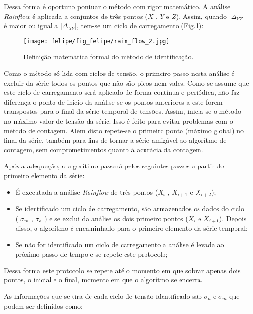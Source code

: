 Dessa forma é oportuno pontuar o método com rigor matemático. A análise \emph{Rainflow} é aplicada a conjuntos de três pontos ($X$ , $Y$ e $Z$). Assim, quando $\left|\Delta_{YZ} \right|$ é maior ou igual a $\left|\Delta_{XY} \right|$, tem-se um ciclo de carregamento (Fig.\ref{rain_flow_2}): 

\begin{figure}[!ht]
    \centering
    \texttt{[image: felipe/fig\_felipe/rain\_flow\_2.jpg]}
    \caption{Definição matemática formal do método de identificação.}
    \label{rain_flow_2}
\end{figure}

Como o método só lida com ciclos de tensão, o primeiro passo nesta análise é excluir da série todos os pontos que não são picos nem vales. Como se assume que este ciclo de carregamento será aplicado de forma contínua e periódica, não faz diferença o ponto de início da análise se os pontos anteriores a este forem transpostos para o final da série temporal de tensões. Assim, inicia-se o método no máximo valor de tensão da série. Isso é feito para evitar problemas com o método de contagem. Além disto repete-se o primeiro ponto (máximo global) no final da série, também para fins de tornar a série amigável ao algorítmo de contagem, sem comprometimentos quanto à acurácia da contagem.

Após a adequação, o algorítimo passará pelos seguintes passos a partir do primeiro elemento da série:
\begin{itemize}
    \item É executada a análise \emph{Rainflow} de três pontos ($X_i$ , $X_{i+1}$ e $X_{i+2}$);
    \item Se identificado um ciclo de carregamento, são armazenados os dados do ciclo ( $\sigma_{m}$ , $\sigma_{a}$ ) e se exclui da análise os dois primeiro pontos ($X_i$ e $X_{i+1}$). Depois disso, o algorítmo é encaminhado para o primeiro elemento da série temporal;
    \item Se não for identificado um ciclo de carregamento a análise é levada ao próximo passo de tempo e se repete este protocolo;    
\end{itemize}

Dessa forma este protocolo se repete até o momento em que sobrar apenas dois pontos, o inicial e o final, momento em que o algorítmo se encerra.
 
As informações que se tira de cada ciclo de tensão identificado são $\sigma_{a}$ e $\sigma_{m}$ que podem ser definidos como:

